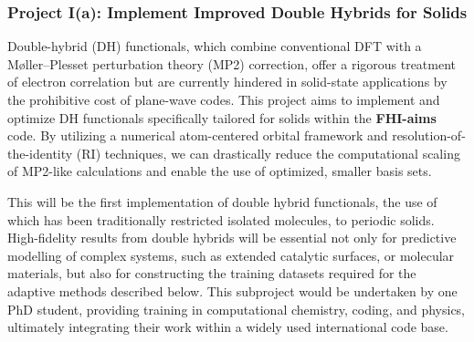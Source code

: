 \documentclass[11pt,letterpaper]{article}
\begin{document}
\subsubsection*{Project I(a): Implement Improved Double Hybrids for Solids}  
Double-hybrid (DH) functionals, which combine conventional DFT with a Møller–Plesset perturbation theory (MP2) correction, offer a rigorous treatment of electron correlation \cite{d1, d2} but are currently hindered in solid-state applications by the prohibitive cost of plane-wave codes. This project aims to implement and optimize DH functionals specifically tailored for solids within the \textbf{FHI-aims} code\cite{fhiaims}. By utilizing a numerical atom-centered orbital framework and resolution-of-the-identity (RI) techniques, we can drastically reduce the computational scaling of MP2-like calculations and enable the use of optimized, smaller basis sets.

This will be the first implementation of double hybrid functionals, the use of which has been traditionally restricted isolated molecules, to periodic solids. High-fidelity results from double hybrids will be essential not only for predictive modelling of complex systems, such as extended catalytic surfaces, or molecular materials, but also for constructing the training datasets required for the adaptive methods described below. This subproject would be undertaken by one PhD student, providing training in computational chemistry, coding, and physics, ultimately integrating their work within a widely used international code base.

\end{document}
